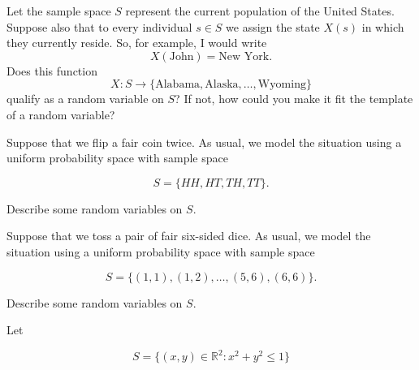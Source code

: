 \documentclass[12pt,reqno]{amsart}
\begin{document}
\bigskip

\prob Let the sample space $S$ represent the current population of the United States. Suppose also that to every individual $s\in S$ we assign the state $X(s)$ in which they currently reside. So, for example, I would write
	\[
	X(\text{John}) = \text{New York}.
	\]
Does this function
	\[
	X: S \to \{\text{Alabama}, \text{Alaska},\ldots,\text{Wyoming}\}
	\]
qualify as a random variable on $S$? If not, how could you make it fit the template of a random variable?\vfill


















\bigskip
\prob Suppose that we flip a fair coin twice. As usual, we model the situation using a uniform probability space with sample space

	\[
	S = \{ HH, HT, TH, TT\}.
	\]

Describe some random variables on $S$.\vfill



















\bigskip

\prob Suppose that we toss a pair of fair six-sided dice. As usual, we model the situation using a uniform probability space with sample space

	\[
	S = \{(1,1),(1,2),\ldots,(5,6),(6,6)\}.
	\]

Describe some random variables on $S$.\vfill

























\newpage
\prob Let

	\[
	S = \{ (x,y) \in \mathbb{R}^2 : x^2+y^2 \leq 1\}
	\]
\end{document}
